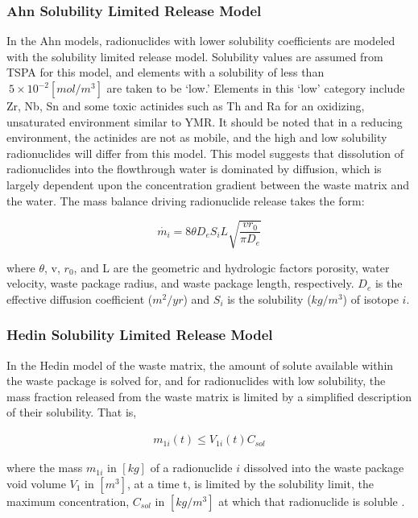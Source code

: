 \subsubsection{Ahn Solubility Limited Release Model}

In the Ahn models, radionuclides with lower solubility coefficients are modeled with
the solubility limited release model.  Solubility values are assumed from TSPA
for this model, and elements with a solubility of less than $~5\times 10^{-2}
[mol/m^3]$ are taken to be
`low.' Elements in this `low' category include Zr, Nb, Sn and some toxic actinides 
such as Th and Ra for an oxidizing, unsaturated environment similar to \gls{YMR}.
It should be noted that in a reducing environment, the actinides are not as mobile, 
and the high and low solubility radionuclides will differ from this model.
This model suggests that dissolution of radionuclides into the flowthrough water 
is dominated by diffusion, which is largely dependent upon the concentration 
gradient between the waste matrix and the water. The mass balance driving 
radionuclide release takes the form:

\begin{equation}
 \dot{m_i}=8\theta D_eS_iL\sqrt{\frac{vr_0}{\pi D_e}}
\end{equation} 

where $\theta$, v, $r_0$, and L are the geometric and
hydrologic factors porosity, water velocity, waste package radius, and waste
package length, respectively. $D_e$ is the effective diffusion coefficient
($m^2/yr$)  and $S_i$ is the solubility ($kg/m^3$) of isotope $i$.


\subsubsection{Hedin Solubility Limited Release Model}

In the Hedin model of the waste matrix, the amount of solute available within
the waste package is solved for, and for radionuclides with low solubility, the mass
fraction released from the waste matrix is limited by a simplified description
of their solubility. That is, 

\begin{align} 
  m_{1i}(t)\le V_{1i}(t)C_{sol}
\end{align}

where the mass $m_{1i}$ in $[kg]$ of a radionuclide $i$ dissolved into the waste package
void volume $V_1$ in $[m^3]$, at a time t, is limited by the solubility limit, 
the maximum concentration, $C_{sol}$ in $[kg/m^3]$ at which that radionuclide is 
soluble \cite{hedin_integrated_2002}.

